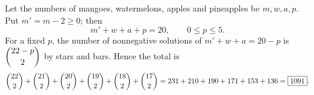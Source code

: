 Let the numbers of mangoes, watermelons, apples and pineapples be $m,w,a,p$. Put $m'=m-2\ge0$; then
\[
m'+w+a+p=20,\qquad 0\le p\le5 .
\]
For a fixed $p$, the number of nonnegative solutions of $m'+w+a=20-p$ is $\dbinom{22-p}{2}$ by stars and bars. Hence the total is
\[
\dbinom{22}{2}+\dbinom{21}{2}+\dbinom{20}{2}+\dbinom{19}{2}+\dbinom{18}{2}+\dbinom{17}{2}=231+210+190+171+153+136=\boxed{1091}.
\]
